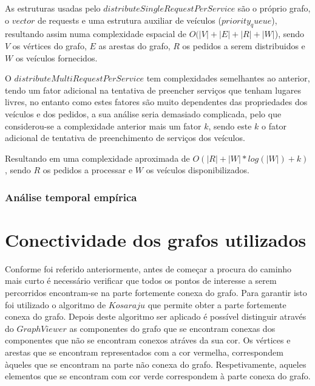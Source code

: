 \documentclass[article, a4paper, 12pt, oneside]{memoir}
\begin{document}
As estruturas usadas pelo $distributeSingleRequestPerService$ são o próprio grafo, o $vector$ de requests e uma estrutura auxiliar de veículos ($priority_queue$), resultando assim numa complexidade espacial de $O(|V|+|E|+|R|+|W|$), sendo $V$ os vértices do grafo, $E$ as arestas do grafo, $R$ os pedidos a serem distribuidos e $W$ os veículos fornecidos.

O $distributeMultiRequestPerService$ tem complexidades semelhantes ao anterior, tendo um fator adicional na tentativa de preencher serviços que tenham lugares livres, no entanto como estes fatores são muito dependentes das propriedades dos veículos e dos pedidos, a sua análise seria demasiado complicada, pelo que considerou-se a complexidade anterior mais um fator $k$, sendo este $k$ o fator adicional de tentativa de preenchimento de serviços dos veículos.

Resultando em uma complexidade aproximada de $O(|R| + |W|*log(|W|) + k)$, sendo $R$ os pedidos a processar e $W$ os veículos disponibilizados.

\subsection{Análise temporal empírica}

\newpage
\chapter[Conectividade dos grafos utilizados][Conectividade dos grafos utilizados]{Conectividade dos grafos utilizados} \label{\thechapter}

Conforme foi referido anteriormente, antes de começar a procura do caminho mais curto é necessário verificar que todos os pontos de interesse a serem percorridos encontram-se na
parte fortemente conexa do grafo. Para garantir isto foi utilizado o algoritmo de $Kosaraju$ que permite obter a parte fortemente conexa do grafo. Depois deste algoritmo ser aplicado
é possível distinguir através do $GraphViewer$ as componentes do grafo que se encontram conexas dos componentes que não se encontram conexos atráves da sua cor. Os vértices e arestas
que se encontram representados com a cor vermelha, correspondem àqueles que se encontram na parte não conexa do grafo. Respetivamente, aqueles elementos que se encontram com cor
verde correspondem à parte conexa do grafo.
\end{document}

